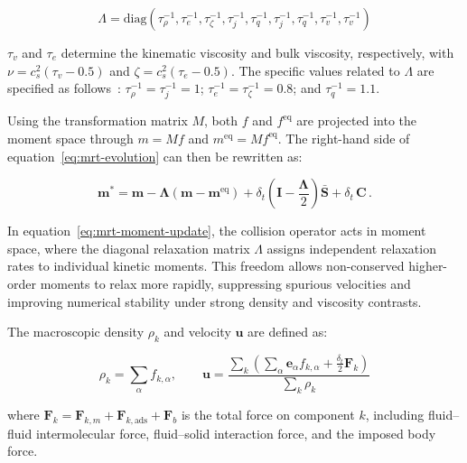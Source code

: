 \documentclass[draft,wrr]{agutexSI2019}
\begin{document}
\begin{article}
\begin{linenomath*}
\begin{equation}
\label{eq:relaxation-matrix}
\Lambda = \mathrm{diag} \left( \tau_{\rho}^{-1}, \tau_{e}^{-1}, \tau_{\zeta}^{-1}, \tau_{j}^{-1}, \tau_{q}^{-1}, \tau_{j}^{-1}, \tau_{q}^{-1}, \tau_{v}^{-1}, \tau_{v}^{-1} \right)
\end{equation}
\end{linenomath*}
$\tau_{v}$ and $\tau_{e}$ determine the kinematic viscosity and bulk viscosity, respectively,
with $\nu = c_{s}^{2}(\tau_{v}-0.5)$ and $\zeta = c_{s}^{2}(\tau_{e}-0.5)$.
The specific values related to $\Lambda$ are specified as follows~\cite{hou_multi_2018}:
$\tau_{\rho}^{-1} = \tau_{j}^{-1} = 1$;
$\tau_{e}^{-1} = \tau_{\zeta}^{-1} = 0.8$; and $\tau_{q}^{-1} = 1.1$.



Using the transformation matrix $M$, both $f$ and $f^{\mathrm{eq}}$ are
projected into the moment space through $m = Mf$ and $m^{\mathrm{eq}} = Mf^{\mathrm{eq}}$.
The right-hand side of equation~\eqref{eq:mrt-evolution} can then be rewritten as:
\begin{linenomath*}
\begin{equation}
\label{eq:mrt-moment-update}
\mathbf{m}^{*}=\mathbf{m}-\bm{\Lambda}\left(\mathbf{m} - \mathbf{m}^{\mathrm{eq}}\right)
+ \delta_t\left(\mathbf{I} - \frac{\bm{\Lambda}}{2}\right)\bar{\mathbf{S}}+\delta_t\,\mathbf{C} \, .
\end{equation}
\end{linenomath*}
In equation~\eqref{eq:mrt-moment-update}, the collision operator acts in moment
space, where the diagonal relaxation matrix $\Lambda$ assigns independent
relaxation rates to individual kinetic moments. This freedom allows non-conserved
higher-order moments to relax more rapidly, suppressing spurious velocities and
improving numerical stability under strong density and viscosity contrasts.

The macroscopic density $\rho_k$ and velocity $\mathbf{u}$ are defined as:
\begin{linenomath*}
\begin{equation}
\rho_k = \sum_{\alpha} f_{k,\alpha},
\qquad
\mathbf{u}
=
\frac{
\sum_{k}
\left(
\sum_{\alpha}
\mathbf{e}_{\alpha} f_{k,\alpha}
+
\frac{\delta_t}{2}\mathbf{F}_k
\right)
}{
\sum_{k} \rho_k
}
\end{equation}
\end{linenomath*}
where $\mathbf{F}_{k} = \mathbf{F}_{k,m} + \mathbf{F}_{k,\text{ads}} + \mathbf{F}_{b}$
is the total force on component $k$, including fluid--fluid intermolecular force,
fluid--solid interaction force, and the imposed body force.


\end{article}
\end{document}
